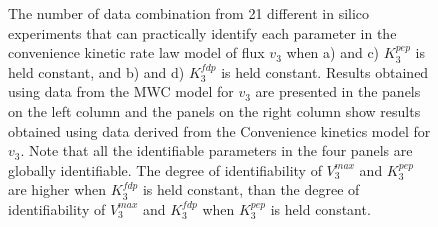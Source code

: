 \documentclass[10pt]{article}
\begin{document}
\begin{figure}[!tbhp]
	\caption{The number of data combination from 21 different in silico experiments that can practically identify each parameter in the convenience kinetic rate law model of flux $v_3$ when a) and c) $K_3^{pep}$ is held constant, and b) and d) $K_3^{fdp}$ is held constant. Results obtained using data from the MWC model for $v_3$ are presented in the panels on the left column and the panels on the right column show results obtained using data derived from the Convenience kinetics model for $v_3$. Note that all the identifiable parameters in the four panels are globally identifiable. The degree of identifiability of $V_3^{max}$ and $K_3^{pep}$ are higher when $K_3^{fdp}$ is held constant, than the degree of identifiability of $V_3^{max}$ and $K_3^{fdp}$ when $K_3^{pep}$ is held constant.}\label{fig:ident_v3_var}
\end{figure} 
\end{document}
